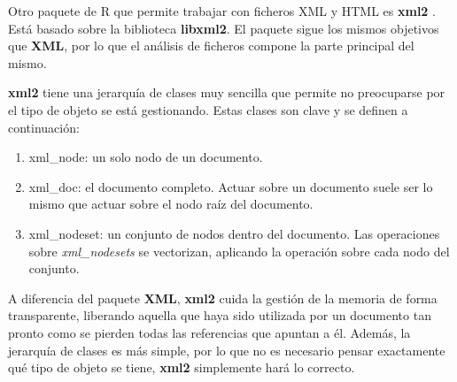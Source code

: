 Otro paquete de R que permite trabajar con ficheros XML y HTML es \textbf{xml2} \cite{xml2-cran}. Está
basado sobre la biblioteca \textbf{libxml2}. El paquete sigue los mismos objetivos que \textbf{XML}, por
lo que el análisis de ficheros compone la parte principal del mismo.

\textbf{xml2} tiene una jerarquía de clases muy sencilla que permite no preocuparse por el tipo de objeto
se está gestionando. Estas clases son clave y se definen a continuación:

\begin{enumerate}
    \item xml\_node: un solo nodo de un documento.
    \item xml\_doc: el documento completo. Actuar sobre un documento suele ser lo mismo que actuar sobre 
    el nodo raíz del documento.
    \item xml\_nodeset: un conjunto de nodos dentro del documento. Las operaciones sobre \emph{xml\_nodesets}
    se vectorizan, aplicando la operación sobre cada nodo del conjunto.
\end{enumerate}

A diferencia del paquete \textbf{XML}, \textbf{xml2} cuida la gestión de la memoria de forma transparente,
liberando aquella que haya sido utilizada por un documento tan pronto como se pierden todas las referencias
que apuntan a él. Además, la jerarquía de clases es más simple, por lo que no es necesario pensar
exactamente qué tipo de objeto se tiene, \textbf{xml2} simplemente hará lo correcto.



